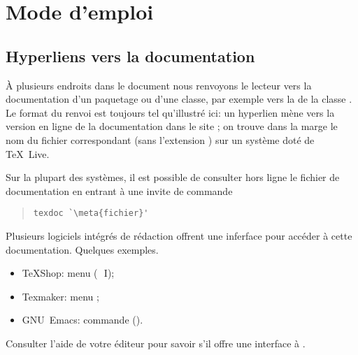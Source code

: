 \chapter{Mode d'emploi}
\label{chap:modedemploi}

\section*{Hyperliens vers la documentation}

À plusieurs endroits dans le document nous renvoyons le lecteur vers
la documentation d'un paquetage ou d'une classe, par exemple vers la %
de la classe . Le format du renvoi est toujours tel
qu'illustré ici: un hyperlien mène vers la version en ligne de la
documentation dans le site %
; on trouve dans la marge le
nom du fichier correspondant (sans l'extension ) sur un
système doté de {\TeX}~Live.

Sur la plupart des systèmes, il est possible de consulter hors ligne
le fichier de documentation  en entrant à une
invite de commande
\begin{quote}
\begin{lstlisting}[backgroundcolor=\color{white}]
texdoc `\meta{fichier}'
\end{lstlisting}
\end{quote}

Plusieurs logiciels intégrés de rédaction offrent une inferface pour
accéder à cette documentation. Quelques exemples.
\begin{itemize}
\item TeXShop: menu  (\optkey\,\cmdkey\, I);
\item Texmaker: menu ;
\item GNU~Emacs: commande  ().
\end{itemize}
Consulter l'aide de votre éditeur pour savoir s'il offre une
interface à .

%

